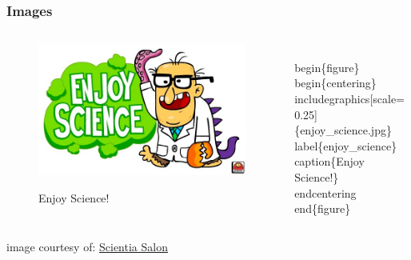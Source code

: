 \documentclass{beamer}
\begin{document}
\begin{frame}[fragile]
	\frametitle{Images}
	\begin{columns}[c]
		\begin{column}{0.5\textwidth}
			\hspace{10pt}
		\begin{figure}
			\begin{centering}
			\includegraphics[scale=0.25]{enjoy_science.jpg}
			\label{enjoy_science}
			\caption{Enjoy Science!}
			\end{centering}
		\end{figure}
		\end{column}
	\hspace{30pt}
	\vrule
	\hspace{10pt}
		\begin{column}{0.5\textwidth}
			\begin{tiny}
		\begin{semiverbatim}
				\\begin\{figure\}
					\\begin\{centering\}
						\\includegraphics[scale=0.25]\{enjoy\_science.jpg\}
						\\label\{enjoy\_science\}
						\\caption\{Enjoy Science!\}
					\\end{centering}
				\\end\{figure\}
		\end{semiverbatim}
					\end{tiny}
		\end{column}
	\end{columns}
	\begin{centering}
	\tiny{image courtesy of: \href{https://scientiasalon.wordpress.com/2014/08/25/science-is-not-a-frog/}{Scientia Salon}}
	\end{centering}
\end{frame}
\end{document}
